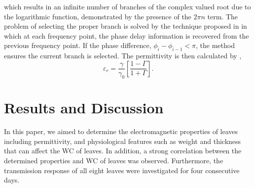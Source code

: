 \documentclass[preprints,article,accept,moreauthors,pdftex]{Definitions/mdpi}
\renewcommand{\^}{\hat}  %
\begin{document}
%
which results in an infinite number of branches of the complex valued root due to the logarithmic function, demonstrated by the presence of the $2 \pi n$ term. The problem of selecting the proper branch is solved by the technique proposed in \cite{Luukkonen2011} in which at each frequency point, the phase delay information is recovered from the previous frequency point. If the phase difference, $\phi_i - \phi_{i-1} < \pi$, the method ensures the current branch is selected. The permittivity is then calculated by \cite{Kim2015},
% 
\begin{equation}
	\varepsilon_r = \frac{\gamma}{\gamma_0} \left[ \dfrac{1 - \Gamma}{1 + \Gamma} \right].
	\label{eq:permittivity}
\end{equation}
%
\section{{Results and Discussion}}
\label{sec:results}
%

In this paper, we aimed to determine the electromagnetic properties of leaves including permittivity, and physiological features such as weight and thickness that can affect the WC of leaves.  In addition, a strong correlation between the determined properties and WC of leaves was observed. Furthermore, the transmission response of all eight leaves were investigated for four consecutive days.

%
\end{document}
